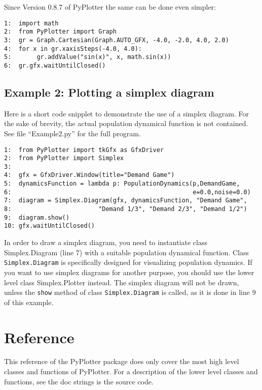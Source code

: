 \documentclass[12pt,a4paper,USenglish]{article}
\begin{document}
Since Version 0.8.7 of PyPlotter the same can be done even simpler:

\begin{verbatim}
1:  import math
2:  from PyPlotter import Graph 
3:  gr = Graph.Cartesian(Graph.AUTO_GFX, -4.0, -2.0, 4.0, 2.0)    
4:  for x in gr.xaxisSteps(-4.0, 4.0):
5:       gr.addValue("sin(x)", x, math.sin(x))
6:  gr.gfx.waitUntilClosed()
\end{verbatim}


\subsection{Example 2: Plotting a simplex diagram}

Here is a short code snipplet to demonstrate the use of a simplex diagram.
For the sake of brevity, the actual population dynamical function is
not contained. See file ``Example2.py'' for the full program.

\begin{verbatim}
1:  from PyPlotter import tkGfx as GfxDriver
2:  from PyPlotter import Simplex
3:
4:  gfx = GfxDriver.Window(title="Demand Game")   
5:  dynamicsFunction = lambda p: PopulationDynamics(p,DemandGame, 
6:                                                  e=0.0,noise=0.0)
7:  diagram = Simplex.Diagram(gfx, dynamicsFunction, "Demand Game",
8:                        "Demand 1/3", "Demand 2/3", "Demand 1/2")
9:  diagram.show()
10: gfx.waitUntilClosed()
\end{verbatim}

In order to draw a simplex diagram, you need to instantiate class
Simplex.Diagram (line 7) with a suitable population dynamical
function. Class {\tt Simplex.Diagram} is specifically designed for
visualizing population dynamics. If you want to use simplex diagrams
for another purpose, you should use the lower level class
Simplex.Plotter instead. The simplex diagram will not be drawn, unless
the {\tt show} method of class {\tt Simplex.Diagram} is called, as it
is done in line 9 of this example.

\section{Reference}

This reference of the {\sf PyPlotter} package does only cover the most high
level classes and functions of {\sf PyPlotter}. For a description of the
lower level classes and functions, see the doc strings is the source
code.
\end{document}

